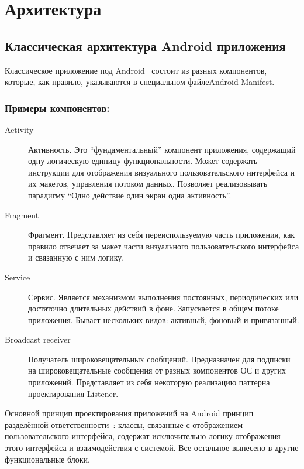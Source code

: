 \chapter{Архитектура}
\section{Классическая архитектура Android приложения}
Классическое приложение под Android~\autocite{app_arch} состоит из разных компонентов, которые, как правило, указываются в специальном файле\textemdash\space Android Manifest.

\subsection*{Примеры компонентов:}
\begin{description}
	\item[Activity~\autocite{android_activities}] Активность. Это ``фундаментальный'' компонент приложения, содержащий одну логическую единицу функциональности. Может содержать инструкции для отображения визуального пользовательского интерфейса и их макетов, управления потоком данных. Позволяет реализовывать парадигму ``Одно действие \textemdash\space один экран \textemdash\space одна активность''.
	\item[Fragment~\autocite{android_fragment}] Фрагмент. Представляет из себя переиспользуемую часть приложения, как правило отвечает за макет части визуального пользовательского интерфейса и связанную с ним логику.
	\item[Service~\autocite{android_service}] Сервис. Является механизмом выполнения постоянных, периодических или достаточно длительных действий в фоне. Запускается в общем потоке приложения. Бывает нескольких видов: активный, фоновый и привязанный.
	\item[Broadcast receiver~\autocite{android_broasdcast}] Получатель широковещательных сообщений. Предназначен для подписки на широковещательные сообщения от разных компонентов ОС и других приложений. Представляет из себя некоторую реализацию паттерна проектирования Listener.
\end{description}

Основной принцип проектирования приложений на Android \textemdash\space принцип разделённой ответственности~\autocite{separation_of_concern}: классы, связанные с отображением пользовательского интерфейса, содержат исключительно логику отображения этого интерфейса и взаимодействия с системой. Все остальное вынесено в другие функциональные блоки.

